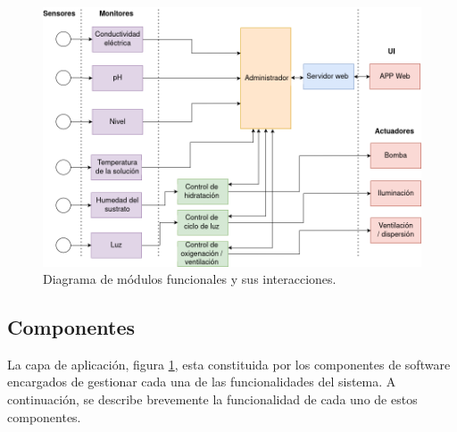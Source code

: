 \begin{figure}[h]
\centering
\includegraphics[scale=.4]{./Figures/arq_bloques.png}
	\caption{Diagrama de módulos funcionales y sus interacciones.}
	\label{fig:arq_bloques}
\end{figure}


\subsection{Componentes}

La capa de aplicación, figura \ref{fig:arq_bloques}, esta constituida por los componentes de software encargados de gestionar cada una de las funcionalidades del sistema.
A continuación, se describe brevemente la funcionalidad de cada uno de estos componentes.

